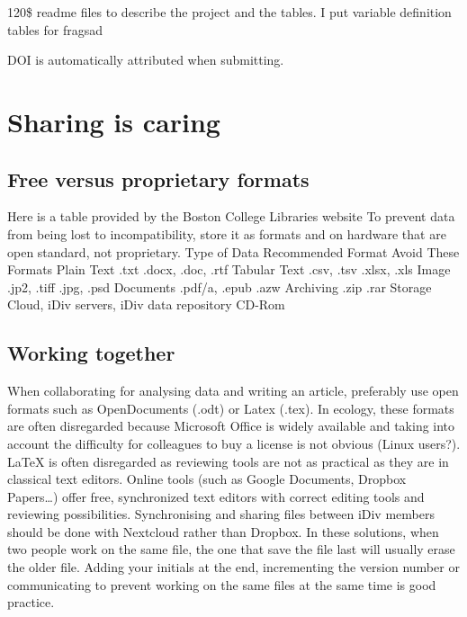 \documentclass[
]{book}
\begin{document}
120\$
readme files to describe the project and the tables. I put variable definition tables for fragsad

DOI is automatically attributed when submitting.

\hypertarget{sharing-is-caring}{%
\chapter{Sharing is caring}\label{sharing-is-caring}}

\hypertarget{free-versus-proprietary-formats}{%
\section{Free versus proprietary formats}\label{free-versus-proprietary-formats}}

Here is a table provided by the Boston College Libraries website
To prevent data from being lost to incompatibility, store it as formats and on hardware that are open standard, not proprietary.
Type of Data Recommended Format Avoid These Formats
Plain Text .txt .docx, .doc, .rtf
Tabular Text .csv, .tsv .xlsx, .xls
Image .jp2, .tiff .jpg, .psd
Documents .pdf/a, .epub .azw
Archiving .zip .rar
Storage Cloud, iDiv servers, iDiv data repository CD-Rom

\hypertarget{working-together}{%
\section{Working together}\label{working-together}}

When collaborating for analysing data and writing an article, preferably use open formats such as OpenDocuments (.odt) or Latex (.tex). In ecology, these formats are often disregarded because Microsoft Office is widely available and taking into account the difficulty for colleagues to buy a license is not obvious (Linux users?). LaTeX is often disregarded as reviewing tools are not as practical as they are in classical text editors.
Online tools (such as Google Documents, Dropbox Papers\ldots) offer free, synchronized text editors with correct editing tools and reviewing possibilities.
Synchronising and sharing files between iDiv members should be done with Nextcloud rather than Dropbox. In these solutions, when two people work on the same file, the one that save the file last will usually erase the older file. Adding your initials at the end, incrementing the version number or communicating to prevent working on the same files at the same time is good practice.
\end{document}
